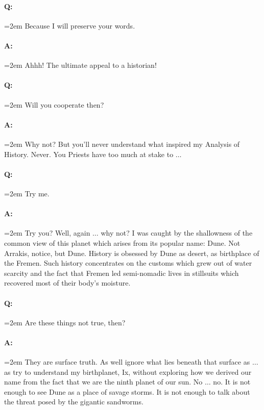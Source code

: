 \documentclass[a4paper, 12pt, oldfontcommands, final]{memoir}
\begin{document}
\paragraph{Q:} \hangindent=2em Because I will preserve your words.
\paragraph{A:} \hangindent=2em Ahhh! The ultimate appeal to a historian!
\paragraph{Q:} \hangindent=2em Will you cooperate then?
\paragraph{A:} \hangindent=2em Why not? But you'll never understand what inspired my Analysis of History. Never. You Priests have too much at stake to $\ldots$ 
\paragraph{Q:} \hangindent=2em Try me.
\paragraph{A:} \hangindent=2em Try you? Well, again $\ldots$ why not? I was caught by the shallowness of the common view of this planet which arises from its popular name: Dune. Not Arrakis, notice, but Dune. History is obsessed by Dune as desert, as birthplace of the Fremen. Such history concentrates on the customs which grew out of water scarcity and the fact that Fremen led semi-nomadic lives in stillsuits which recovered most of their body's moisture.
\paragraph{Q:} \hangindent=2em Are these things not true, then?
\paragraph{A:} \hangindent=2em They are surface truth. As well ignore what lies beneath that surface as $\ldots$ as try to understand my birthplanet, Ix, without exploring how we derived our name from the fact that we are the ninth planet of our sun. No $\ldots$ no. It is not enough to see Dune as a place of savage storms. It is not enough to talk about the threat posed by the gigantic sandworms.
\end{document}
